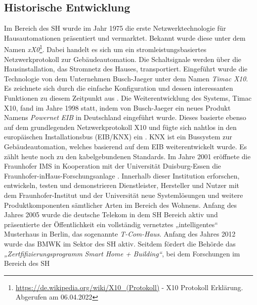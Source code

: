     \subsection{Historische Entwicklung}
    \label{subsec:entwicklung_sh}
        Im Bereich des \acl{SH} wurde im Jahr 1975 die erste Netzwerktechnologie für Hausautomationen 
        präsentiert und vermarktet. Bekannt wurde diese unter dem Namen \textit{xX0}\footnote{\url{https://de.wikipedia.org/wiki/X10_(Protokoll)} - X10 Protokoll Erklärung. Abgerufen am 06.04.2022}. 
        Dabei handelt es sich um ein stromleistungsbasiertes Netzwerkprotokoll zur Gebäudeautomation. Die 
        Schaltsignale werden über die Hausinstallation, das Stromnetz des Hauses, transportiert. Eingeführt wurde die 
        Technologie von dem Unternehmen Busch-Jaeger unter dem Namen \textit{Timac X10}. Es zeichnete sich durch die 
        einfache Konfiguration und dessen interessanten Funktionen zu diesem Zeitpunkt aus \cite{aschendorf2014energiemanagement}. %
        Die Weiterentwicklung des Systems, Timac X10, fand im Jahre 1998 statt, indem von Busch-Jaeger ein neues 
        Produkt Namens \textit{Powernet EIB} in Deutschland eingeführt wurde. Dieses basierte ebenso auf dem grundlegenden 
        Netzwerkprotokoll X10 und fügte sich nahtlos in den europäischen Installationsbus (EIB/KNX) ein \cite{busch-jaeger}. 
        KNX ist ein Bussystem zur Gebäudeautomation, welches basierend auf dem EIB weiterentwickelt wurde. Es 
        zählt heute noch zu den kabelgebundenen Standards. Im Jahre 2001 eröffnete die Fraunhofer IMS in Kooperation 
        mit der Universität Duisburg-Essen die Fraunhofer-inHaus-Forschungsanlage \cite{fraunhofer-forschungsanlage}. 
        Innerhalb dieser Institution erforschen, entwickeln, testen und demonstrieren Dienstleister, Hersteller und Nutzer 
        mit dem Fraunhofer-Institut und der Universität neue Systemlösungen und weitere Produktkomponenten sämtlicher Arten 
        im Bereich des Wohnens. Anfang des Jahres 2005 wurde die deutsche Telekom in dem \acl{SH} Bereich aktiv und 
        präsentierte der Öffentlichkeit ein vollständig vernetztes „intelligentes“ Musterhaus in Berlin, das sogenannte 
        \textit{T-Com-Haus}. Anfang des Jahres 2012 wurde das \ac{BMWK} im Sektor des \acl{SH} aktiv. Seitdem fördert die 
        Behörde das \textit{„Zertfifizierungsprogramm Smart Home + Building“}, bei dem Forschungen im Bereich des \acl{SH} 
